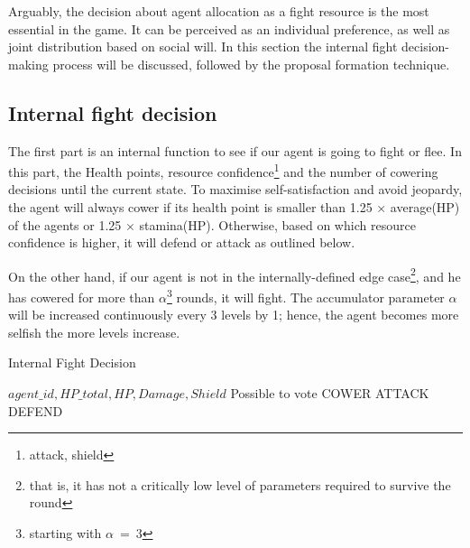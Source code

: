
Arguably, the decision about agent allocation as a fight resource is the most essential in the game. It can be perceived as an individual preference, as well as joint distribution based on social will. In this section the internal fight decision-making process will be discussed, followed by the proposal formation technique.


    \subsection{Internal fight decision}

        The first part is an internal function to see if our agent is going to fight or flee. In this part, the Health points, resource confidence\footnote{attack, shield} and the number of cowering decisions until the current state.
        To maximise self-satisfaction and avoid jeopardy, the agent will always cower if its health point is smaller  than  1.25 $\times$ average(HP) of the agents or 1.25 $\times$ stamina(HP). Otherwise, based on which resource confidence is higher, it will defend or attack as outlined below.

        On the other hand, if our agent is not in the internally-defined edge case\footnote{that is, it has not a critically low level of parameters required to survive the round}, and he has cowered for more than $\alpha$\footnote{starting with $\alpha~=~3$} rounds, it will fight. The accumulator parameter $\alpha$ will be increased continuously every 3 levels by 1; hence, the agent becomes more selfish the more levels increase.




\begin{algorithm}
\caption{Internal Fight Decision}\label{alg:8}
\begin{algorithmic} 
\scriptsize
\Require $agent\_id, HP\_total, HP, Damage, Shield$
\Ensure Possible to vote
\Return COWER
\EndIf
\Return ATTACK
\EndIf
{}
\Return DEFEND
\EndIf
\end{algorithmic}
\end{algorithm}

